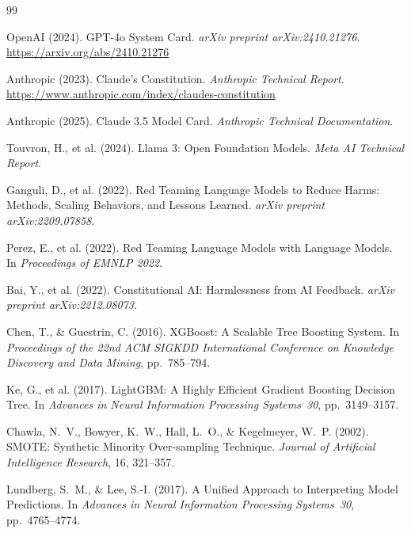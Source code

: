 \documentclass[10pt,letterpaper]{article}
\begin{document}
\begin{thebibliography}{99}

OpenAI (2024).
\newblock GPT-4o System Card.
\newblock \emph{arXiv preprint arXiv:2410.21276}.
\newblock \url{https://arxiv.org/abs/2410.21276}

Anthropic (2023).
\newblock Claude's Constitution.
\newblock \emph{Anthropic Technical Report}.
\newblock \url{https://www.anthropic.com/index/claudes-constitution}

Anthropic (2025).
\newblock Claude 3.5 Model Card.
\newblock \emph{Anthropic Technical Documentation}.

Touvron, H., et al. (2024).
\newblock Llama 3: Open Foundation Models.
\newblock \emph{Meta AI Technical Report}.

Ganguli, D., et al. (2022).
\newblock Red Teaming Language Models to Reduce Harms: Methods, Scaling
  Behaviors, and Lessons Learned.
\newblock \emph{arXiv preprint arXiv:2209.07858}.

Perez, E., et al. (2022).
\newblock Red Teaming Language Models with Language Models.
\newblock In \emph{Proceedings of EMNLP 2022}.

Bai, Y., et al. (2022).
\newblock Constitutional AI: Harmlessness from AI Feedback.
\newblock \emph{arXiv preprint arXiv:2212.08073}.

Chen, T., \& Guestrin, C. (2016).
\newblock XGBoost: A Scalable Tree Boosting System.
\newblock In \emph{Proceedings of the 22nd ACM SIGKDD International Conference
  on Knowledge Discovery and Data Mining}, pp.~785--794.

Ke, G., et al. (2017).
\newblock LightGBM: A Highly Efficient Gradient Boosting Decision Tree.
\newblock In \emph{Advances in Neural Information Processing Systems~30},
  pp.~3149--3157.

Chawla, N.~V., Bowyer, K.~W., Hall, L.~O., \& Kegelmeyer, W.~P. (2002).
\newblock SMOTE: Synthetic Minority Over-sampling Technique.
\newblock \emph{Journal of Artificial Intelligence Research}, 16, 321--357.

Lundberg, S.~M., \& Lee, S.-I. (2017).
\newblock A Unified Approach to Interpreting Model Predictions.
\newblock In \emph{Advances in Neural Information Processing Systems~30},
  pp.~4765--4774.


\end{thebibliography}
\end{document}
